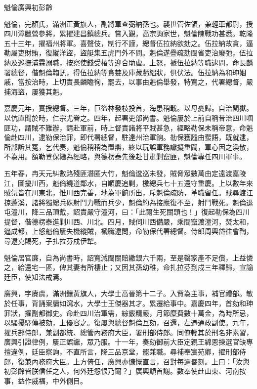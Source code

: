 
\begin{pinyinscope}
魁倫廣興初彭齡

魁倫，完顏氏，滿洲正黃旗人，副將軍查弼納孫也。襲世管佐領，兼輕車都尉，授四川漳臘營參將，累擢建昌鎮總兵。嘗入覲，高宗詢家世，魁倫陳戰功甚悉。乾隆五十三年，擢福州將軍。喜聲伎，制行不謹，總督伍拉納欲劾之。伍拉納故貪，逼勒屬吏財賄，復縱洋盜，盜艇集五虎門外不問。魁倫遂疊疏劾閩省吏治廢弛，伍拉納及巡撫浦霖溺職，按察使錢受椿等迎合助虐。上怒，褫伍拉納等職逮問，命長麟署總督，偕魁倫鞫訊，得伍拉納等貪婪及庫藏虧絀狀，俱伏法。伍拉納為和珅姻戚，當按治時，上切責長麟瞻徇，罷去，以事由魁倫舉發，特寬之，代署總督，嚴捕海盜，屢獲其魁。

嘉慶元年，實授總督。三年，巨盜林發枝投首，海患稍戢。以母憂歸。自治閩獄。以伉直聞於時，仁宗尤眷之。四年，起署吏部尚書。魁倫屢於上前自稱昔治四川啯匪功，謂賊不難辦，請赴軍前，時上督責諸將平賊甚急，經略勒保未稱帝意，命魁倫赴四川，逮勒保治罪，即代署總督，駐達州治軍餉。勒保獲譴由蜚語，既就逮，所部訴其冤，乞代奏，魁倫稍稍為置辯，終以玩誤軍務讞擬重闢，軍心因之渙散，不為用。額勒登保繼為經略，與德楞泰先後赴甘肅剿竄匪，魁倫專任四川軍事。

五年春，冉天元糾數路殘匪潛匿大竹，魁倫逡巡未發，賊脅眾數萬由定遠渡嘉陵江，圖擾川西，魁倫繞道鄰水，自順慶追剿，檄總兵七十五還守重慶。上以數年來賊氛皆在川東北，惟川西完善，地為軍餉所出，斥魁倫疏防，革職留任。賊尋渡江掠蓬溪，諸將獨總兵硃射鬥力戰而兵少，魁倫約為接應復不至，射鬥戰死。魁倫退屯潼川，降三品頂戴，詔責嚴守潼河，曰：「此爾生死關頭也！」復起勒保為四川提督，偕德楞泰進剿川西、川北。四月，賊伺川西備嚴，乘間竄渡潼河，焚太和，逼成都，上怒魁倫屢失機縱賊，褫職逮問，命勒保代署總督。侍郎周興岱往會鞫，尋逮克賜死，子扎拉芬戍伊犁。

魁倫居官廉，自為尚書時，詔寬減閩關賠繳銀六千兩，至是罄家產不足償，上益憐之，給還宅一區，俾其妻有所棲止；又因其孫幼稚，命扎拉芬到戍三年釋歸，宣諭廷臣，使知法戒焉。

廣興，字賡虞，滿洲鑲黃旗人，大學士高晉第十二子。入貲為主事，補官禮部。敏於任事，背誦案牘如瀉水，大學士王傑器其才。累遷給事中。嘉慶四年，首劾和珅罪狀，擢副都御史。命赴四川治軍需，綜覈精嚴，月節糜費數十萬金，為時所忌，以騷擾驛傳被劾，上優容之。復屢與總督魁倫互劾，召還，左遷通政副使。九年，擢兵部侍郎，兼副都統、總管內務府大臣，署刑部侍郎。同僚輕其於刑名非素習，廣興引證律例，屢正誤讞，眾乃服。十一年，奏劾御前大臣定親王綿恩揀選官缺專擅違例，廷臣察詢，不直所言，降三品京堂，罷兼職。尋補奉宸苑卿，擢刑部侍郎，復兼內務府大臣。上方倚任，廣興亦慷慨直言，召對每逾晷刻。上曰：「汝與初彭齡皆朕信任之人，何外廷怨恨乃爾？」廣興頫首謝。數奉使赴山東、河南按事，益作威福，中外側目。


\end{pinyinscope}

